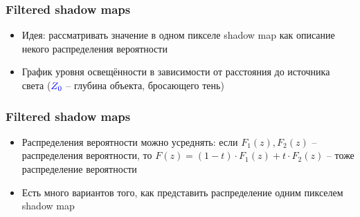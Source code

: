 \documentclass[10pt]{beamer}
\begin{document}
\begin{frame}[fragile]
\frametitle{Filtered shadow maps}
\begin{itemize}
\item Идея: рассматривать значение в одном пикселе shadow map как описание некого распределения вероятности
\pause
\item График уровня освещённости в зависимости от расстояния до источника света (\begin{math}\color{blue}Z_0\end{math} -- глубина объекта, бросающего тень)
\end{itemize}
\begin{center}
\end{center}
\end{frame}

\begin{frame}[fragile]
\frametitle{Filtered shadow maps}
\begin{itemize}
\item Распределения вероятности можно усреднять: если \begin{math}F_1(z), F_2(z)\end{math} -- распределения вероятности, то \begin{math}F(z) = (1 - t) \cdot F_1(z) + t \cdot F_2(z)\end{math} -- тоже распределение вероятности
\pause
\item Есть много вариантов того, как представить распределение одним пикселем shadow map
\end{itemize}
\end{frame}
\end{document}
